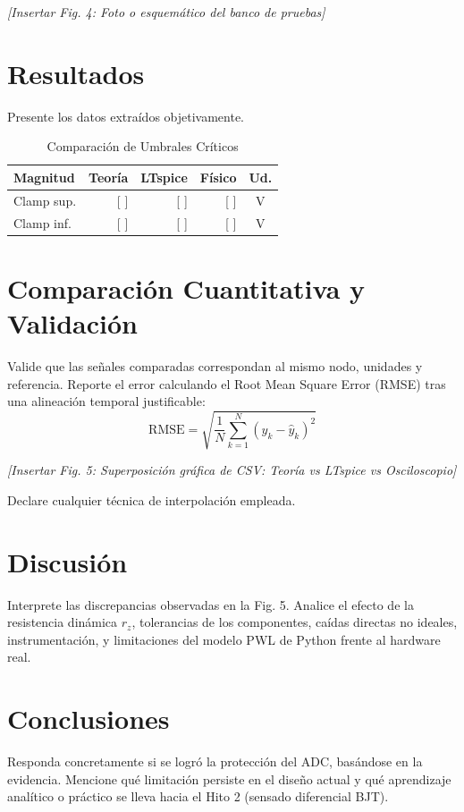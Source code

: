 \documentclass[10pt, a4paper, twocolumn]{article}
\begin{document}
\textit{[Insertar Fig. 4: Foto o esquemático del banco de pruebas]}

\section{Resultados}
Presente los datos extraídos objetivamente.

\begin{table}[h]
\centering
\caption{Comparación de Umbrales Críticos}
\begin{tabularx}{\linewidth}{X r r r c}
\toprule
\textbf{Magnitud} & \textbf{Teoría} & \textbf{LTspice} & \textbf{Físico} & \textbf{Ud.} \\
\midrule
Clamp sup. & [ ] & [ ] & [ ] & V \\
Clamp inf. & [ ] & [ ] & [ ] & V \\
\bottomrule
\end{tabularx}
\end{table}

\section{Comparación Cuantitativa y Validación}
Valide que las señales comparadas correspondan al mismo nodo, unidades y referencia. Reporte el error calculando el Root Mean Square Error (RMSE) tras una alineación temporal justificable:
\begin{equation}
    \text{RMSE} = \sqrt{\frac{1}{N}\sum_{k=1}^{N}(y_k-\hat{y}_k)^2}
\end{equation}

\textit{[Insertar Fig. 5: Superposición gráfica de CSV: Teoría vs LTspice vs Osciloscopio]}

Declare cualquier técnica de interpolación empleada.

\section{Discusión}
Interprete las discrepancias observadas en la Fig. 5. Analice el efecto de la resistencia dinámica $r_z$, tolerancias de los componentes, caídas directas no ideales, instrumentación, y limitaciones del modelo PWL de Python frente al hardware real.

\section{Conclusiones}
Responda concretamente si se logró la protección del ADC, basándose en la evidencia. Mencione qué limitación persiste en el diseño actual y qué aprendizaje analítico o práctico se lleva hacia el Hito 2 (sensado diferencial BJT).
\end{document}
